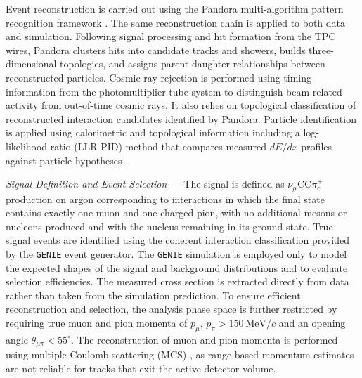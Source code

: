 \documentclass[aps,prl,reprint,superscriptaddress,nofootinbib, showpacs]{revtex4-2}
\begin{document}
Event reconstruction is carried out using the Pandora multi-algorithm pattern recognition framework \cite{MicroBooNE_Pandora2018}. The same reconstruction chain is applied to both data and simulation. Following signal processing and hit formation from the TPC wires, Pandora clusters hits into candidate tracks and showers, builds three-dimensional topologies, and assigns parent-daughter relationships between reconstructed particles. Cosmic-ray rejection is performed using timing information from the photomultiplier tube system to distinguish beam-related activity from out-of-time cosmic rays. It also relies on topological classification of reconstructed interaction candidates identified by Pandora. Particle identification is applied using calorimetric and topological information including a log-likelihood ratio (LLR PID) method that compares measured $dE/dx$ profiles against particle hypotheses \cite{MicroBooNE_LLRPID2021}. 

\textit{Signal Definition and Event Selection ---} The signal is defined as $\nu_\mu$CC$\pi^+_c$ production on argon corresponding to interactions in which the final state contains exactly one muon and one charged pion, with no additional mesons or nucleons produced and with the nucleus remaining in its ground state. True signal events are identified using the coherent interaction classification provided by the \texttt{GENIE} event generator. The \texttt{GENIE} simulation is employed only to model the expected shapes of the signal and background distributions and to evaluate selection efficiencies. The measured cross section is extracted directly from data rather than taken from the simulation prediction. To ensure efficient reconstruction and selection, the analysis phase space is further restricted by requiring true muon and pion momenta of $p_{\mu},\,p_{\pi} > 150~\mathrm{MeV}/c$ and an opening angle $\theta_{\mu\pi} < 55^{\circ}$. The reconstruction of muon and pion momenta is performed using multiple Coulomb scattering (MCS) \cite{Abratenko_2017}, as range-based momentum estimates are not reliable for tracks that exit the active detector volume.
\end{document}
